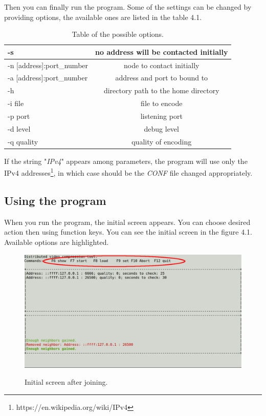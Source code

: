Then you can finally run the program. Some of the settings can be changed by providing options, the available ones are listed in the table 4.1.

\begin{table}[h]
\begin{center}
 \begin{tabular}{ | l | c |}
   \hline
-s & no address will be contacted initially \\ \hline
-n [address]:port\_number & node to contact initially \\ \hline
-a [address]:port\_number & address and port to bound to \\ \hline
-h & directory path to the home directory \\ \hline
-i file & file to encode \\ \hline
-p port & listening port \\ \hline
-d level & debug level \\ \hline
-q quality & quality of encoding \\ \hline
 \end{tabular}
 \caption{Table of the possible options.}
 \end{center}
\end{table}

If the string "\textit{IPv4}" appears among parameters, the program will use only the IPv4 addresses\footnote{https://en.wikipedia.org/wiki/IPv4},
in which case should be the \textit{CONF} file changed appropriately.

\subsection{Using the program}
When you run the program, the initial screen appears. You can choose desired action then using function keys. You can see the initial screen in the figure 4.1. Available options are highlighted.
\begin{figure}[h]
\begin{center}
\includegraphics[scale=0.35]{./img/init-screen.pdf}
\label{initial-screen}
\caption[initial-screen]{Initial screen after joining.}
\end{center}
\end{figure}

